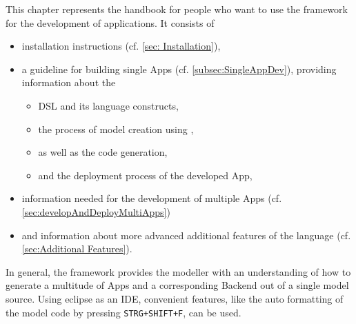 

This chapter represents the handbook for people who want to use the \MD framework for the development of applications. It consists of

\begin{itemize}
	\item installation instructions (cf. \ref{sec: Installation}),
	\item a guideline for building single Apps (cf. \ref{subsec:SingleAppDev}), providing information about the
	\begin{itemize}
		\item DSL and its language constructs,
		\item the process of model creation using \MD,
		\item as well as the code generation,
		\item and the deployment process of the developed App,
	\end{itemize}
	\item information needed for the development of multiple Apps (cf. \ref{sec:developAndDeployMultiApps})
	\item and information about more advanced additional features of the language (cf. \ref{sec:Additional Features}).
\end{itemize}

In general, the \MD framework provides the modeller with an understanding of how to generate a multitude of Apps and a corresponding Backend out of a single model source. Using eclipse as an IDE, convenient features, like the auto formatting of the model code by pressing \lstinline|STRG+SHIFT+F|, can be used.